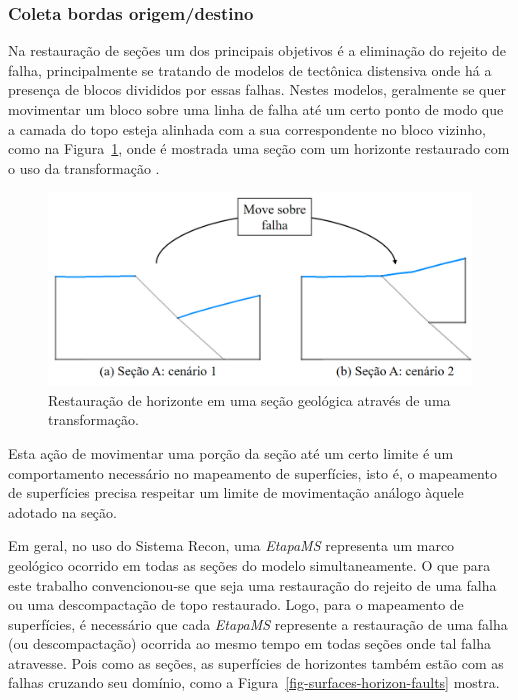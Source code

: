 \subsubsection{Coleta bordas origem/destino}

Na restauração de seções um dos principais objetivos é a eliminação do rejeito de falha, principalmente se tratando de modelos de tectônica distensiva onde há a presença de blocos divididos por essas falhas\cite{Santi}. Nestes modelos, geralmente se quer movimentar um bloco sobre uma linha de falha até um certo ponto de modo que a camada do topo esteja alinhada com a sua correspondente no bloco vizinho, como na Figura~\ref{fig-section-horizon-restored}, onde é mostrada uma seção com um horizonte restaurado com o uso da transformação .

\begin{figure} [H]
  \begin{center}
    \includegraphics[width=350pt]{images/fig-section-horizon-restored}
    \caption{Restauração de horizonte em uma seção geológica através de uma transformação.}\label{fig-section-horizon-restored}
  \end{center}
\end{figure}

Esta ação de movimentar uma porção da seção até um certo limite é um comportamento necessário no mapeamento de superfícies, isto é, o mapeamento de superfícies precisa respeitar um limite de movimentação análogo àquele adotado na seção.

Em geral, no uso do Sistema Recon, uma \textit{EtapaMS} representa um marco geológico ocorrido em todas as seções do modelo simultaneamente. O que para este trabalho convencionou-se que seja uma restauração do rejeito de uma falha ou uma descompactação de topo restaurado. Logo, para o mapeamento de superfícies, é necessário que cada \textit{EtapaMS} represente a restauração de uma falha (ou descompactação) ocorrida ao mesmo tempo em todas seções onde tal falha atravesse. Pois como as seções, as superfícies de horizontes também estão com as falhas cruzando seu domínio, como a Figura~\ref{fig-surfaces-horizon-faults} mostra.

